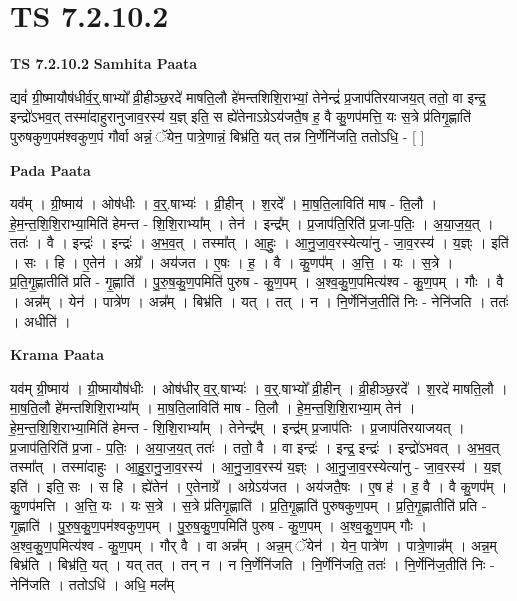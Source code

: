 \documentclass[17pt]{extarticle}
\begin{document}
\section{ TS 7.2.10.2 }

\textbf{TS 7.2.10.2 } \newline
\textbf{Samhita Paata} \newline

द्यवं॑ ग्री॒ष्मायौष॑धीर्व॒र्॒.षाभ्यो᳚ व्री॒हीञ्छ॒रदे॑ माषति॒लौ हे॑मन्तशिशि॒राभ्यां॒ तेनेन्द्रं॑ प्र॒जाप॑तिरयाजय॒त् ततो॒ वा इन्द्र॒ इन्द्रो॑ऽभव॒त् तस्मा॑दाहुरानुजाव॒रस्य॑ य॒ज्ञ् इति॒ स ह्ये॑तेनाऽग्रेऽय॑जतै॒ष ह॒ वै कु॒णप॑मत्ति॒ यः स॒त्रे प्र॑तिगृ॒ह्णाति॑ पुरुषकुण॒पम॑श्वकुण॒पं गौर्वा अन्नं॒ ॅयेन॒ पात्रे॒णान्नं॒ बिभ्र॑ति॒ यत् तन्न नि॒र्णेनि॑जति॒ ततोऽधि॒ - [  ] \newline

\textbf{Pada Paata} \newline

यव᳚म् । ग्री॒ष्माय॑ । ओष॑धीः । व॒र्॒.षाभ्यः॑ । व्री॒हीन् । श॒रदे᳚ । मा॒ष॒ति॒लाविति॑ माष - ति॒लौ । हे॒म॒न्त॒शि॒शि॒राभ्या॒मिति॑ हेमन्त - शि॒शि॒राभ्या᳚म् । तेन॑ । इन्द्र᳚म् । प्र॒जाप॑ति॒रिति॑ प्र॒जा-प॒तिः॒ । अ॒या॒ज॒य॒त् । ततः॑ । वै । इन्द्रः॑ । इन्द्रः॑ । अ॒भ॒व॒त् । तस्मा᳚त् । आ॒हुः॒ । आ॒नु॒जा॒व॒रस्येत्या॑नु - जा॒व॒रस्य॑ । य॒ज्ञ्ः । इति॑ । सः । हि । ए॒तेन॑ । अग्रे᳚ । अय॑जत । ए॒षः । ह॒ । वै । कु॒णप᳚म् । अ॒त्ति॒ । यः । स॒त्रे । प्र॒ति॒गृ॒ह्णातीति॑ प्रति - गृ॒ह्णाति॑ । पु॒रु॒ष॒कु॒ण॒पमिति॑ पुरुष - कु॒ण॒पम् । अ॒श्व॒कु॒ण॒पमित्य॑श्व - कु॒ण॒पम् । गौः । वै । अन्न᳚म् । येन॑ । पात्रे॑ण । अन्न᳚म् । बिभ्र॑ति । यत् । तत् । न । नि॒र्णेनि॑ज॒तीति॑ निः - नेनि॑जति । ततः॑ । अधीति॑ ।  \newline


\textbf{Krama Paata} \newline

यव॑म् ग्री॒ष्माय॑ । ग्री॒ष्मायौष॑धीः । ओष॑धीर् व॒र्॒.षाभ्यः॑ । व॒र्॒.षाभ्यो᳚ व्री॒हीन् । व्री॒हीञ्छ॒रदे᳚ । श॒रदे॑ माषति॒लौ । मा॒ष॒ति॒लौ हे॑मन्तशिशि॒राभ्या᳚म् । मा॒ष॒ति॒लाविति॑ माष - ति॒लौ । हे॒म॒न्त॒शि॒शि॒राभ्या॒म् तेन॑ । हे॒म॒न्त॒शि॒शि॒राभ्या॒मिति॑ हेमन्त - शि॒शि॒राभ्या᳚म् । तेनेन्द्र᳚म् । इन्द्र॑म् प्र॒जाप॑तिः । प्र॒जाप॑तिरयाजयत् । प्र॒जाप॑ति॒रिति॑ प्र॒जा - प॒तिः॒ । अ॒या॒ज॒य॒त् ततः॑ । ततो॒ वै । वा इन्द्रः॑ । इन्द्र॒ इन्द्रः॑ । इन्द्रो॑ऽभवत् । अ॒भ॒व॒त् तस्मा᳚त् । तस्मा॑दाहुः । आ॒हु॒रा॒नु॒जा॒व॒रस्य॑ । आ॒नु॒जा॒व॒रस्य॑ य॒ज्ञ्ः । आ॒नु॒जा॒व॒रस्येत्या॑नु - जा॒व॒रस्य॑ । य॒ज्ञ् इति॑ । इति॒ सः । स हि । ह्ये॑तेन॑ । ए॒तेनाग्रे᳚ । अग्रेऽय॑जत । अय॑जतै॒षः । ए॒ष ह॑ । ह॒ वै । वै कु॒णप᳚म् । कु॒णप॑मत्ति । अ॒त्ति॒ यः । यः स॒त्रे । स॒त्रे प्र॑तिगृ॒ह्णाति॑ । प्र॒ति॒गृ॒ह्णाति॑ पुरुषकुण॒पम् । प्र॒ति॒गृ॒ह्णातीति॑ प्रति - गृ॒ह्णाति॑ । पु॒रु॒ष॒कु॒ण॒पम॑श्वकुण॒पम् । पु॒रु॒ष॒कु॒ण॒पमिति॑ पुरुष - कु॒ण॒पम् । अ॒श्व॒कु॒ण॒पम् गौः । अ॒श्व॒कु॒ण॒पमित्य॑श्व - कु॒ण॒पम् । गौर् वै । वा अन्न᳚म् । अन्न॒म् ॅयेन॑ । येन॒ पात्रे॑ण । पात्रे॒णान्न᳚म् । अन्न॒म् बिभ्र॑ति । बिभ्र॑ति॒ यत् । यत् तत् । तन् न । न नि॒र्णेनि॑जति । नि॒र्णेनि॑जति॒ ततः॑ । नि॒र्णेनि॑ज॒तीति॑ निः - नेनि॑जति । ततोऽधि॑ । अधि॒ मल᳚म् \newline
\end{document}
